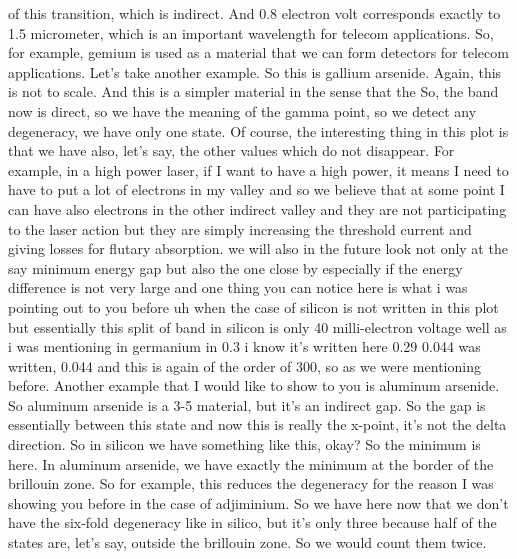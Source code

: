 of this transition, which is indirect. And 0.8 electron volt corresponds exactly to 1.5 micrometer, which is an important wavelength for telecom applications. So, for example, gemium is used as a material that we can form detectors for telecom applications. Let's take another example.
So this is gallium arsenide. Again, this is not to scale. And this is a simpler material in the sense that the So, the band now is direct, so we have the meaning of the gamma point, so we detect any degeneracy, we have only one state. Of course, the interesting thing in this plot is that we have also, let's say, the other values which do not disappear. For example, in a high power laser, if I want to have a high power, it means I need to have to put a lot of electrons in my valley and so we believe that at some point I can have also electrons in the other indirect valley and they are not participating to the laser action but they are simply increasing the threshold current and giving losses for flutary absorption. we will also in the future look not only at the say minimum energy gap but also the one close by especially if the energy difference is not very large and one thing you can notice here is what i was pointing out to you before uh when the case of silicon is not written in this plot but essentially this split of band in silicon is only 40 milli-electron voltage well as i was mentioning in germanium in 0.3 i know it's written here 0.29 0.044 was written, 0.044 and this is again of the order of 300, so as we were mentioning before. Another example that I would like to show to you is aluminum arsenide. So aluminum arsenide is a 3-5 material, but it's an indirect gap. So the gap is essentially between this state and now this is really the x-point, it's not the delta direction. So in silicon we have something like this, okay? So the minimum is here. In aluminum arsenide, we have exactly the minimum at the border of the brillouin zone. So for example, this reduces the degeneracy for the reason I was showing you before in the case of adjiminium. So we have here now that we don't have the six-fold degeneracy like in silico, but it's only three because half of the states are, let's say, outside the brillouin zone. So we would count them twice.
